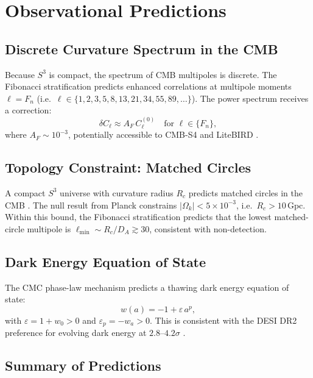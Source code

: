 \documentclass[12pt,a4paper]{article}
\theoremstyle{definition}
\theoremstyle{remark}
\begin{document}
\section{Observational Predictions}
\label{sec:predictions}

\subsection{Discrete Curvature Spectrum in the CMB}

Because $S^3$ is compact, the spectrum of CMB multipoles is discrete. The Fibonacci
stratification predicts enhanced correlations at multipole moments
$\ell = F_n$ (i.e.\ $\ell\in\{1,2,3,5,8,13,21,34,55,89,\ldots\}$). The power
spectrum receives a correction:
\[
\delta C_\ell \approx A_F\, C_\ell^{(0)} \quad \text{for } \ell\in\{F_n\},
\]
where $A_F\sim 10^{-3}$, potentially accessible to CMB-S4 \cite{CMBS4} and
LiteBIRD \cite{LiteBIRD}.

\subsection{Topology Constraint: Matched Circles}

A compact $S^3$ universe with curvature radius $R_c$ predicts matched circles in
the CMB \cite{Cornish1998}. The null result from Planck \cite{Planck2016} constrains
$|\Omega_k| < 5\times 10^{-3}$, i.e.\ $R_c > 10\,\mathrm{Gpc}$. Within this bound,
the Fibonacci stratification predicts that the lowest matched-circle multipole is
$\ell_{\min} \sim R_c/D_A \gtrsim 30$, consistent with non-detection.

\subsection{Dark Energy Equation of State}

The CMC phase-law mechanism \cite{PreeceBatenin2025} predicts a thawing dark energy
equation of state:
\[
w(a) = -1 + \varepsilon\, a^p,
\]
with $\varepsilon = 1+w_0 > 0$ and $\varepsilon_p = -w_a > 0$. This is consistent
with the DESI DR2 preference for evolving dark energy at $2.8$--$4.2\sigma$
\cite{DESI2025a,DESI2025b}.

\subsection{Summary of Predictions}
\end{document}
